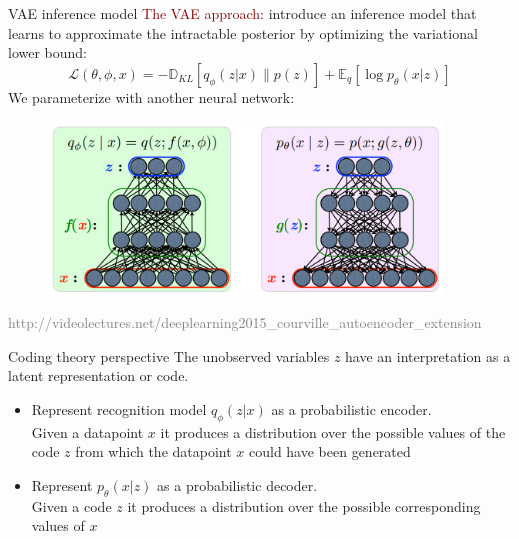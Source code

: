 \documentclass[unicode,11pt]{beamer}
\begin{document}
\begin{frame}[fragile]{VAE inference model}
  \textcolor{darkred}{The VAE approach}: introduce an inference model that
  learns to approximate the intractable posterior by optimizing the variational lower bound:
  $$ \mathcal{L}(\theta, \phi, x) = -\mathbb{D}_{KL}[q_{\phi} (z|x) \parallel p(z)] +
  \mathbb{E}_q [\log p_\theta (x|z)] $$
  We parameterize with another neural network:
  \begin{figure}[htbp]
    \includegraphics[height=130pt, keepaspectratio = true]{images/vae}
  \end{figure}
  \tiny \textcolor{gray}{http://videolectures.net/deeplearning2015\_courville\_autoencoder\_extension}
\end{frame}

\begin{frame}[fragile]{Coding theory perspective}
  The unobserved variables $z$ have an interpretation as a latent representation or code.

  \begin{itemize}
    \item Represent recognition model $q_{\phi}(z|x)$ as a probabilistic encoder.\\
        Given a datapoint $x$ it produces a distribution over the possible values of the code $z$
        from which the datapoint $x$ could have been generated
    \item Represent $p_{\theta}(x|z)$ as a probabilistic decoder.\\
        Given a code $z$ it produces a distribution over the possible corresponding values of $x$
  \end{itemize}
\end{frame}
\end{document}
